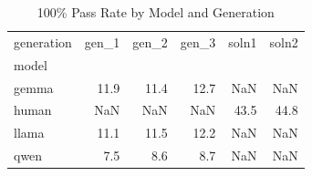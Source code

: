 \begin{table}[htbp]
\caption{100\% Pass Rate by Model and Generation}
\label{tab:pass_rate_gen}
\begin{tabular}{lrrrrr}
\toprule
generation & gen\_1 & gen\_2 & gen\_3 & soln1 & soln2 \\
model &  &  &  &  &  \\
\midrule
gemma & 11.9 & 11.4 & 12.7 & NaN & NaN \\
human & NaN & NaN & NaN & 43.5 & 44.8 \\
llama & 11.1 & 11.5 & 12.2 & NaN & NaN \\
qwen & 7.5 & 8.6 & 8.7 & NaN & NaN \\
\bottomrule
\end{tabular}
\end{table}
